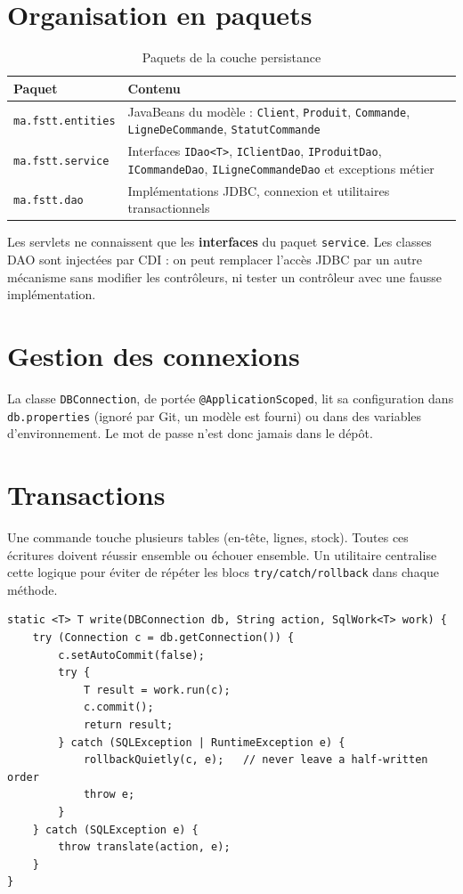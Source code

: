 \documentclass[11pt,a4paper]{report}
\begin{document}
\section{Organisation en paquets}
\begin{table}[H]
\centering
\caption{Paquets de la couche persistance}\label{tab:paquets}
\begin{tabularx}{\textwidth}{@{}lX@{}}
\toprule
\textbf{Paquet} & \textbf{Contenu}\\
\midrule
\texttt{ma.fstt.entities} & JavaBeans du mod\`ele : \texttt{Client}, \texttt{Produit}, \texttt{Commande}, \texttt{LigneDeCommande}, \texttt{StatutCommande}\\
\texttt{ma.fstt.service} & Interfaces \texttt{IDao<T>}, \texttt{IClientDao}, \texttt{IProduitDao}, \texttt{ICommandeDao}, \texttt{ILigneCommandeDao} et exceptions m\'etier\\
\texttt{ma.fstt.dao} & Impl\'ementations JDBC, connexion et utilitaires transactionnels\\
\bottomrule
\end{tabularx}
\end{table}

Les servlets ne connaissent que les \textbf{interfaces} du paquet \texttt{service}. Les classes DAO sont inject\'ees par CDI : on peut remplacer l'acc\`es JDBC par un autre m\'ecanisme sans modifier les contr\^oleurs, ni tester un contr\^oleur avec une fausse impl\'ementation.

\section{Gestion des connexions}
La classe \texttt{DBConnection}, de port\'ee \texttt{@ApplicationScoped}, lit sa configuration dans \texttt{db.properties} (ignor\'e par Git, un mod\`ele est fourni) ou dans des variables d'environnement. Le mot de passe n'est donc jamais dans le d\'ep\^ot.

\section{Transactions}
Une commande touche plusieurs tables (en-t\^ete, lignes, stock). Toutes ces \'ecritures doivent r\'eussir ensemble ou \'echouer ensemble. Un utilitaire centralise cette logique pour \'eviter de r\'ep\'eter les blocs \texttt{try/catch/rollback} dans chaque m\'ethode.

\begin{lstlisting}[language=JavaEE,caption={Ex\'ecution d'un travail dans une transaction (\texttt{Jdbc.write})},label={lst:tx}]
static <T> T write(DBConnection db, String action, SqlWork<T> work) {
    try (Connection c = db.getConnection()) {
        c.setAutoCommit(false);
        try {
            T result = work.run(c);
            c.commit();
            return result;
        } catch (SQLException | RuntimeException e) {
            rollbackQuietly(c, e);   // never leave a half-written order
            throw e;
        }
    } catch (SQLException e) {
        throw translate(action, e);
    }
}
\end{lstlisting}
\end{document}
